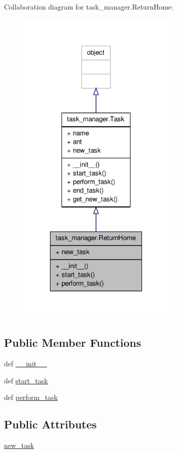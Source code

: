 Collaboration diagram for task\+\_\+manager.\+Return\+Home\+:
\nopagebreak
\begin{figure}[H]
\begin{center}
\leavevmode
\includegraphics[width=216pt]{classtask__manager_1_1ReturnHome__coll__graph}
\end{center}
\end{figure}
\subsection*{Public Member Functions}
\begin{DoxyCompactItemize}
\item 
def \hyperlink{classtask__manager_1_1ReturnHome_ada66b785625008db20221e1b53d419f6}{\+\_\+\+\_\+init\+\_\+\+\_\+}
\item 
def \hyperlink{classtask__manager_1_1ReturnHome_a8201892f7668c2ca1e7c08f2a51c4309}{start\+\_\+task}
\item 
def \hyperlink{classtask__manager_1_1ReturnHome_ab9d2b69cbefdeaf308df564c13f5aac2}{perform\+\_\+task}
\end{DoxyCompactItemize}
\subsection*{Public Attributes}
\begin{DoxyCompactItemize}
\item 
\hyperlink{classtask__manager_1_1ReturnHome_afd37383d07987cb20f716cfe86b7b957}{new\+\_\+task}
\end{DoxyCompactItemize}


